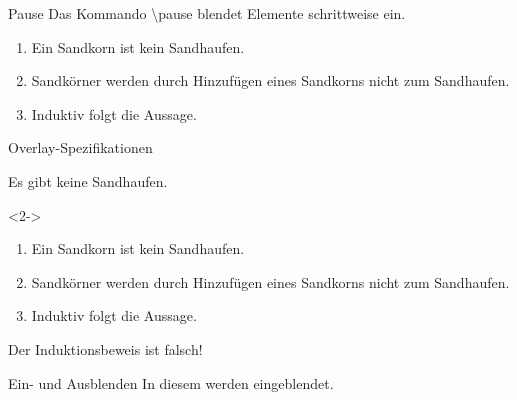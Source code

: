 \documentclass{beamer}
\begin{document}
  \begin{frame}{Pause}
    Das Kommando \textbackslash pause blendet Elemente schrittweise ein.

    \begin{enumerate}
      \item Ein Sandkorn ist kein Sandhaufen.
        \pause
      \item Sandkörner werden durch Hinzufügen
        eines Sandkorns nicht zum Sandhaufen.
        \pause
      \item Induktiv folgt die Aussage. \qedhere
    \end{enumerate}
  \end{frame}

  \begin{frame}{Overlay-Spezifikationen}
	  \begin{Satz}[Sandhaufensatz]
	    Es gibt keine Sandhaufen.
	  \end{Satz}

	  \begin{Beweis}<2->
	    \begin{enumerate}
	      \item<3-> Ein Sandkorn ist kein Sandhaufen.
	      \item<4-> Sandkörner werden durch Hinzufügen
	        eines Sandkorns nicht zum Sandhaufen.
	      \item Induktiv folgt die Aussage. \qedhere
	    \end{enumerate}
	  \end{Beweis}


	  Der \alert<6>{Induktionsbeweis} ist
	  \alert<7>{falsch}!
	\end{frame}

	\begin{frame}{Ein- und Ausblenden}
	  In diesem  werden
	  eingeblendet.
	\end{frame}
\end{document}
